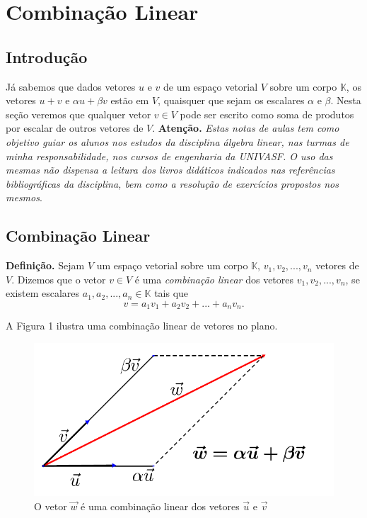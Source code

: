 \chapter{Combinação Linear}
\thispagestyle{empty}

\section{Introdução}
Já sabemos que  dados vetores $u$ e $v$ de um espaço vetorial $V$ sobre um corpo $\mathbb{K}$,  os vetores $u+v$ e  $\alpha u+\beta v$ estão   em $V$, quaisquer que sejam os escalares $\alpha$ e $\beta$. Nesta seção veremos que qualquer vetor $v \in V$ pode ser escrito como soma de  produtos por escalar de outros vetores de $V$.  \textbf{Atenção.} \textit{Estas notas de aulas tem como objetivo guiar os alunos nos  estudos da disciplina álgebra linear, nas turmas de minha responsabilidade, nos cursos de engenharia da UNIVASF. O uso das mesmas  não dispensa  a leitura  dos livros didáticos indicados nas referências bibliográficas da disciplina, bem como a resolução de exercícios propostos nos mesmos}.

\section{Combinação Linear}


\textbf{Definição.} Sejam $V$ um espaço vetorial sobre um corpo $\mathbb{K}$,  $v_1, v_2,..., v_n$ vetores de $V$.  Dizemos que o vetor $v \in V$ é uma \textit{ combinação linear} dos vetores $v_1, v_2,..., v_n$, se existem  escalares $a_1, a_2, ..., a_n \in \mathbb{K}$  tais que
\begin{equation}v=a_1v_1+a_2v_2+...+a_n v_n. \end{equation}

\vspace{0.3cm}

A Figura 1 ilustra uma combinação linear de vetores no plano.
\begin{centering}
\begin{figure}[h!]
\includegraphics[width=1.0\textwidth]{chapters/combinacao_linear/img/com_linear}
\caption{\footnotesize{ O vetor $\vec{w}$ é uma combinação linear dos vetores $\vec{u}$  e $\vec{v}$}}
\label{fig:comb_linear}
\end{figure}
\end{centering}


